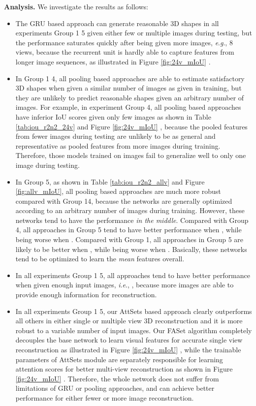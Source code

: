 \documentclass[twocolumn]{svjour3}    \pdfoutput=1
\newcommand{\nickname}{AttSets}
\newcommand{\faset}{FASet}
\newcommand{\ie}{\textit{i}.\textit{e}., }
\newcommand{\eg}{\textit{e}.\textit{g}., }
\newcommand*\circled[1]{\tikz[baseline=(char.base)]{
            \node[shape=circle,draw,inner sep=0.1pt] (char) {#1};}}
\begin{document}
\textbf{Analysis.} We investigate the results as follows: 
\vspace{-0.2cm}
\begin{itemize}[leftmargin=0.3cm]
\item The GRU based approach can generate reasonable 3D shapes in all experiments Group 1  5 given either few or multiple images during testing, but the performance saturates quickly after being given more images, \eg 8 views, because the recurrent unit is hardly able to capture features from longer image sequences, as illustrated in Figure \ref{fig:24v_mIoU} \circled{1}.

\item In Group 1  4, all pooling based approaches are able to estimate satisfactory 3D shapes when given a similar number of images as given in training, but they are unlikely to predict reasonable shapes given an arbitrary number of images. For example, in experiment Group 4, all pooling based approaches have inferior IoU scores given only few images as shown in Table \ref{tab:iou_r2n2_24v} and Figure \ref{fig:24v_mIoU} \circled{2}, because the pooled features from fewer images during testing are unlikely to be as general and representative as pooled features from more images during training. Therefore, those models trained on  images fail to generalize well to only one image during testing.

\item In Group 5, as shown in Table \ref{tab:iou_r2n2_allv} and Figure \ref{fig:allv_mIoU}, all pooling based approaches are much more robust compared with Group 14, because the networks are generally optimized according to an arbitrary number of images during training. However, these networks tend to have the performance \textit{in the middle}. Compared with Group 4, all approaches in Group 5 tend to have better performance when , while being worse when . Compared with Group 1, all approaches in Group 5 are likely to be better when , while being worse when . Basically, these networks tend to be optimized to learn the \textit{mean} features overall.

\item  In all experiments Group 1  5, all approaches tend to have better performance when given enough input images, \ie , because more images are able to provide enough information for reconstruction.

\item In all experiments Group 1  5, our \nickname{} based approach clearly outperforms all others in either single or multiple view 3D reconstruction and it is more robust to a variable number of input images. Our \faset{} algorithm completely decouples the base network to learn visual features for accurate single view reconstruction as illustrated in Figure \ref{fig:24v_mIoU} \circled{3}, while the trainable parameters of \nickname{} module are separately responsible for learning attention scores for better multi-view reconstruction as shown in Figure \ref{fig:24v_mIoU} \circled{4}. Therefore, the whole network does not suffer from limitations of GRU or pooling approaches, and can achieve better performance for either fewer or more image reconstruction.
\end{itemize}
\end{document}
